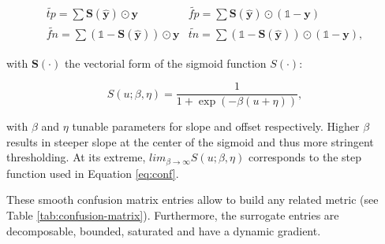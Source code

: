 \begin{equation}
\label{eq:smooth}
\begin{array}{ll} \widetilde{\mathit{tp}} = \sum \mathbf{S}(\hat{\mathbf{y}}) \odot \mathbf{y}  & \widetilde{\mathit{fp}} = \sum \mathbf{S}(\hat{\mathbf{y}}) \odot (\mathds{1} - \mathbf{y}) \\ \widetilde{\mathit{fn}} = \sum (\mathds{1} - \mathbf{S}(\hat{\mathbf{y}})) \odot \mathbf{y} & \widetilde{\mathit{tn}} = \sum (\mathds{1} - \mathbf{S}(\hat{\mathbf{y}})) \odot (\mathds{1} - \mathbf{y}),
\end{array}
\end{equation}

with $\mathbf{S}(\cdot)$ the vectorial form of the sigmoid function $S(\cdot)$:

\begin{equation}
S(u; \beta, \eta)=\frac{1}{1+\exp (-\beta (u + \eta))},
\end{equation}

with \(\beta\) and \(\eta\) tunable parameters for slope and offset respectively. Higher \(\beta\) results in steeper slope at the center of the sigmoid and thus more stringent thresholding. At its extreme, \(lim_{\beta\to\infty} S(u; \beta, \eta)\) corresponds to the step function used in Equation \ref{eq:conf}.


These smooth confusion matrix entries allow to build any related metric (see Table \ref{tab:confusion-matrix}). Furthermore, the surrogate entries are decomposable, bounded, saturated and have a dynamic gradient.

